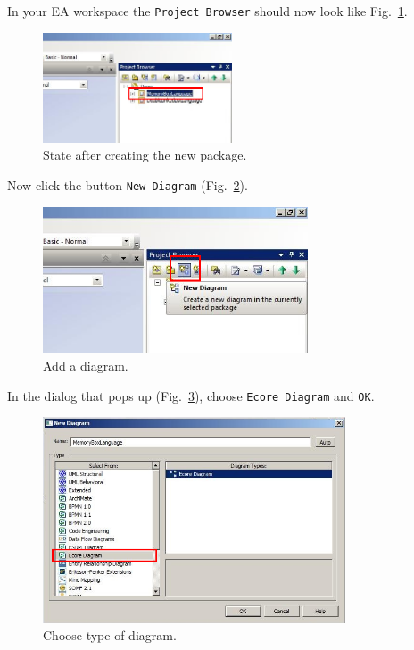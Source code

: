 In your EA workspace the \texttt{Project Browser} should now look like
Fig.~\ref{fig:new_package_completed}.

\begin{figure}[htbp]
	\centering
  \includegraphics[width=0.5\textwidth]{pics/memBox03.png}
	\caption{State after creating the new package.}
	\label{fig:new_package_completed}
\end{figure}

\clearpage 

Now click the button \texttt{New Diagram} (Fig.~\ref{fig:diagram}).

\begin{figure}[htbp]
	\centering
  \includegraphics[width=0.7\textwidth]{pics/memBox04.png}
	\caption{Add a diagram.}
	\label{fig:diagram}
\end{figure}

In the dialog that pops up (Fig.~\ref{fig:diagram_type}), choose \texttt{Ecore
Diagram} and  \texttt{OK}. 


\begin{figure}[htbp]
	\centering
  \includegraphics[width=0.8\textwidth]{pics/memBox05.png}
	\caption{Choose type of diagram.}
	\label{fig:diagram_type}
\end{figure}

